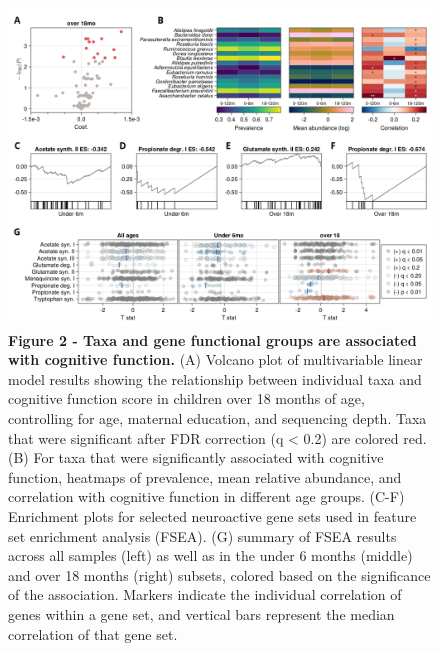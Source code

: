 \documentclass[a4paper]{article}
\begin{document}
\begin{figure}[h]
    \centering
    \includegraphics[width=\textwidth]{assets/Figure2.png}
    \caption{
        \textbf{Figure 2 - Taxa and gene functional groups are associated with cognitive function.}
        (A) Volcano plot of multivariable linear model results showing the
        relationship between individual taxa and cognitive function score in
        children over 18 months of age, controlling for age, maternal education,
        and sequencing depth. Taxa that were significant after FDR correction (q
        \textless{} 0.2) are colored red. (B) For taxa that were significantly
        associated with cognitive function, heatmaps of prevalence, mean
        relative abundance, and correlation with cognitive function in different
        age groups. (C-F) Enrichment plots for selected neuroactive gene sets
        used in feature set enrichment analysis (FSEA). (G) summary of FSEA
        results across all samples (left) as well as in the under 6 months
        (middle) and over 18 months (right) subsets, colored based on the
        significance of the association. Markers indicate the individual
        correlation of genes within a gene set, and vertical bars represent the
        median correlation of that gene set.
    }
    \label{fig:Figure 2}
\end{figure}
\end{document}
